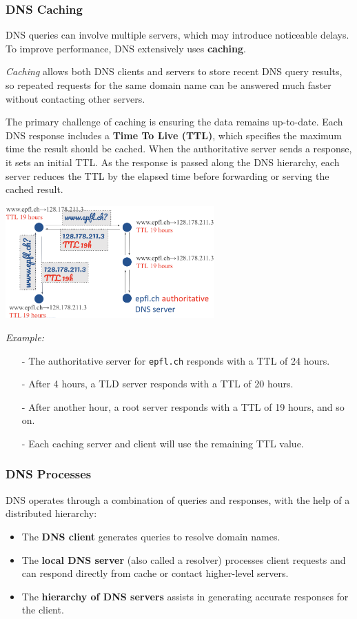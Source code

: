\documentclass[../../compsys.tex]{subfiles}
\begin{document}
\noindent
\subsubsection{DNS Caching}
DNS queries can involve multiple servers, which may introduce noticeable delays. To improve performance, DNS extensively uses \textbf{caching}. 

\textit{Caching} allows both DNS clients and servers to store recent DNS query results, so repeated requests for the same domain name can be answered much faster without contacting other servers.

The primary challenge of caching is ensuring the data remains up-to-date. Each DNS response includes a \textbf{Time To Live (TTL)}, which specifies the maximum time the result should be cached. When the authoritative server sends a response, it sets an initial TTL. As the response is passed along the DNS hierarchy, each server reduces the TTL by the elapsed time before forwarding or serving the cached result.

\begin{center}
    \includegraphics[width=0.6\textwidth]{images/ttl.png}
\end{center}

\textit{Example:}
\begin{itemize}
    \item[-] The authoritative server for \texttt{epfl.ch} responds with a TTL of 24 hours.
    \item[-] After 4 hours, a TLD server responds with a TTL of 20 hours.
    \item[-] After another hour, a root server responds with a TTL of 19 hours, and so on.
    \item[-] Each caching server and client will use the remaining TTL value.
\end{itemize}

\subsubsection{DNS Processes}
DNS operates through a combination of queries and responses, with the help of a distributed hierarchy:
\begin{itemize}
    \item The \textbf{DNS client} generates queries to resolve domain names.
    \item The \textbf{local DNS server} (also called a resolver) processes client requests and can respond directly from cache or contact higher-level servers.
    \item The \textbf{hierarchy of DNS servers} assists in generating accurate responses for the client.
\end{itemize}
\end{document}
